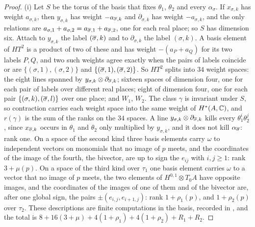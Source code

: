 \begin{proof}
(i) Let $S$ be the torus of the basis that fixes $\theta_{1}$, $\theta_{2}$
and every $\alpha_{\sigma}$. If $x_{\sigma,k}$ has weight $a_{\sigma,k}$, then
$y_{\sigma,k}$ has weight $-a_{\overline{\sigma},k}$ and $\partial_{\sigma,k}$ has
weight $-a_{\sigma,k}$, and the only relations are
$a_{\sigma,1}+a_{\sigma,2}=a_{\overline{\sigma},1}+a_{\overline{\sigma},2}$, one for each
real place; so $S$ has dimension six. Attach to $y_{\sigma,k}$ the label
$(\overline{\sigma},k)$ and to $\partial_{\sigma,k}$ the label $(\sigma,k)$. A basis
element of $HT^{2}$ is a product of two of these and has weight
$-(a_{P}+a_{Q})$ for its two labels $P,Q$, and two such weights agree exactly
when the pairs of labels coincide or are $\{(\sigma,1),(\sigma,2)\}$ and
$\{(\overline{\sigma},1),(\overline{\sigma},2)\}$. So $HT^{2}$ splits into $34$ weight
spaces: the eight lines spanned by $y_{\sigma,k}\otimes
\partial_{\overline{\sigma},k}$; sixteen spaces of dimension four, one for each
pair of labels over different real places; eight of dimension four, one for
each pair $\{(\sigma,k),(\overline{\sigma},l)\}$ over one place; and $W_{1}$,
$W_{2}$. The class $\gamma$ is invariant under $S$, so contraction carries
each weight space into the same weight of $H^{*}(A,\mathbb{C})$, and $r(\gamma)$ is
the sum of the ranks on the $34$ spaces. A line $y_{\sigma,k}\otimes
\partial_{\overline{\sigma},k}$ kills every $\theta_{1}^{i}\theta_{2}^{j}$, since
$x_{\overline{\sigma},k}$ occurs in $\theta_{1}$ and $\theta_{2}$ only multiplied by
$y_{\sigma,k}$, and it does not kill $\alpha_{\overline{\sigma}}$: rank one. On a
space of the second kind three basis elements carry $\omega$ to independent
vectors on monomials that no image of $p$ meets, and the coordinates of the
image of the fourth, the bivector, are up to sign the $e_{ij}$ with
$i,j\ge1$: rank $3+\mu(p)$. On a space of the third kind over $\tau_{1}$ one
basis element carries $\omega$ to a vector that no image of $p$ meets, the
two elements of $H^{0,1}\otimes T_{0}A$ have opposite images, and the
coordinates of the images of one of them and of the bivector are, after one
global sign, the pairs $\pm(e_{i,j},e_{i+1,j})$: rank $1+\rho_{1}(p)$, and
$1+\rho_{2}(p)$ over $\tau_{2}$. These descriptions are finite computations
in the basis, recorded in \cite{BMB26}, and the total is
$8+16(3+\mu)+4(1+\rho_{1})+4(1+\rho_{2})+R_{1}+R_{2}$.


\end{proof}
